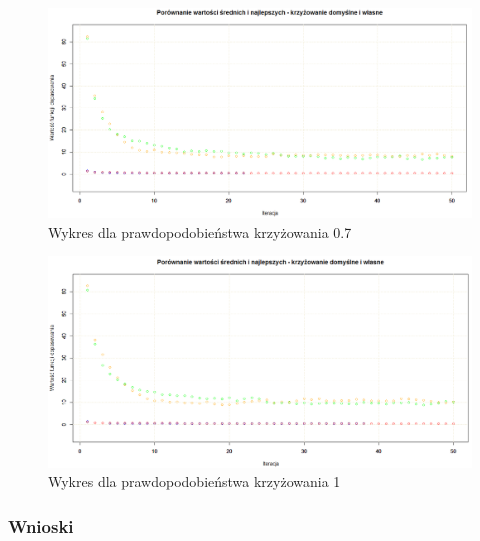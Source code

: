\begin{figure}[H]
	\centering
	\hspace*{-0.8in}
	\includegraphics[scale = 0.5]{img/zad1/cross_0_7}
	\caption{Wykres dla prawdopodobieństwa krzyżowania 0.7}  
	\label{rys:cross_0_7} 
\end{figure}


\begin{figure}[H]
	\centering
	\hspace*{-0.8in}
	\includegraphics[scale = 0.5]{img/zad1/cross_1}
	\caption{Wykres dla prawdopodobieństwa krzyżowania 1}  
	\label{rys:cross_1} 
\end{figure}


\subsubsection{Wnioski}

